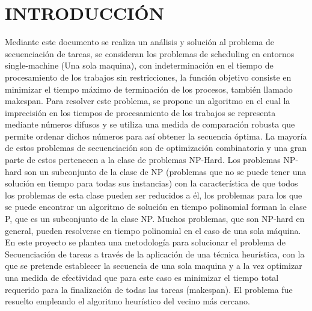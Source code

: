 \documentclass[twocolumn,10pt]{article}
\begin{document}
\section{INTRODUCCIÓN}
\justifying
Mediante este documento se realiza un análisis y solución al problema de secuenciación de tareas, se consideran los problemas de scheduling en entornos single-machine (Una sola maquina), con indeterminación en el tiempo de procesamiento de los trabajos sin restricciones, la función objetivo consiste en minimizar el tiempo máximo de terminación de los procesos, también llamado makespan. Para resolver este problema, se propone un algoritmo en el cual la imprecisión en los tiempos de procesamiento de los trabajos se representa mediante números difusos y se utiliza una medida de comparación robusta que permite ordenar dichos números para así obtener la secuencia óptima. La mayoría de estos problemas de secuenciación son de optimización combinatoria y una gran parte de estos pertenecen a la clase de problemas NP-Hard. Los problemas NP-hard son un subconjunto de la clase de NP (problemas que no se puede tener una solución en tiempo para todas sus instancias) con la característica de que todos los problemas de esta clase pueden ser reducidos a él, los problemas para los que se puede encontrar un algoritmo de solución en tiempo polinomial forman la clase P, que es un subconjunto de la clase NP. Muchos problemas, que son NP-hard en general, pueden resolverse en tiempo polinomial en el caso de una sola máquina.
En este proyecto se plantea una metodología para solucionar el problema de Secuenciación de tareas a través de la aplicación de una técnica heurística, con la que se pretende establecer la secuencia de una sola maquina y a la vez optimizar una medida de efectividad que para este caso es minimizar el tiempo total requerido para la finalización de todas las tareas (makespan). El problema fue resuelto empleando el algoritmo heurístico del vecino más cercano.
\end{document}
